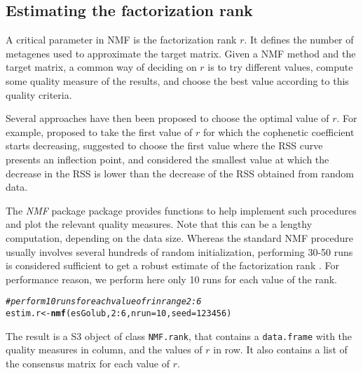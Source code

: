 \documentclass[a4paper]{article}\usepackage[]{graphicx}\usepackage[]{color}
\makeatletter
\newcommand{\hlnum}[1]{\textcolor[rgb]{0.686,0.059,0.569}{#1}}%
\newcommand{\hlcom}[1]{\textcolor[rgb]{0.678,0.584,0.686}{\textit{#1}}}%
\newcommand{\hlopt}[1]{\textcolor[rgb]{0,0,0}{#1}}%
\newcommand{\hlstd}[1]{\textcolor[rgb]{0.345,0.345,0.345}{#1}}%
\newcommand{\hlkwb}[1]{\textcolor[rgb]{0.69,0.353,0.396}{#1}}%
\newcommand{\hlkwc}[1]{\textcolor[rgb]{0.333,0.667,0.333}{#1}}%
\newcommand{\hlkwd}[1]{\textcolor[rgb]{0.737,0.353,0.396}{\textbf{#1}}}%
\newenvironment{kframe}{%
 \def\at@end@of@kframe{}%
 \ifinner\ifhmode%
  \def\at@end@of@kframe{\end{minipage}}%
  \begin{minipage}{\columnwidth}%
 \fi\fi%
 \def\FrameCommand##1{\hskip\@totalleftmargin \hskip-\fboxsep
 \colorbox{shadecolor}{##1}\hskip-\fboxsep
     \hskip-\linewidth \hskip-\@totalleftmargin \hskip\columnwidth}%
 \MakeFramed {\advance\hsize-\width
   \@totalleftmargin\z@ \linewidth\hsize
   \@setminipage}}%
 {\par\unskip\endMakeFramed%
 \at@end@of@kframe}
\newenvironment{knitrout}{}{} %
\let\code=\texttt
\newcommand{\pkgname}[1]{\textit{#1}\xspace}
\newcommand{\Rpkg}[1]{\pkgname{#1} package\xspace}
\newcommand{\nmfpack}{\Rpkg{NMF}}
\renewcommand{\cite}[1]{\parencite{#1}}
\makeatother
\begin{document}
\subsection{Estimating the factorization rank}
A critical parameter in NMF is the factorization rank $r$. 
It defines the number of metagenes used to approximate the target matrix.
Given a NMF method and the target matrix, a common way of deciding on $r$ is to try different values, compute some quality measure of the results, and choose the best value according to this quality criteria.

Several approaches have then been proposed to choose the optimal value of $r$.
For example, \cite{Brunet2004} proposed to take the first value of $r$ for which the cophenetic coefficient starts decreasing, \cite{Hutchins2008} suggested to choose the first value where the RSS curve presents an inflection point, and \cite{Frigyesi2008} considered the smallest value at which the decrease in the RSS is lower than the decrease of the RSS obtained from random data.

The \nmfpack package provides functions to help implement such procedures and plot the relevant quality measures.
Note that this can be a lengthy computation, depending on the data size.
Whereas the standard NMF procedure usually involves several hundreds of random initialization, performing 30-50 runs is considered sufficient to get a robust estimate of the factorization rank \cite{Brunet2004, Hutchins2008}.
For performance reason, we perform here only 10 runs for each value of the rank.

\begin{knitrout}
\color{fgcolor}\begin{kframe}
\begin{alltt}
\hlcom{# perform 10 runs for each value of r in range 2:6}
\hlstd{estim.r} \hlkwb{<-} \hlkwd{nmf}\hlstd{(esGolub,} \hlnum{2}\hlopt{:}\hlnum{6}\hlstd{,} \hlkwc{nrun} \hlstd{=} \hlnum{10}\hlstd{,} \hlkwc{seed} \hlstd{=} \hlnum{123456}\hlstd{)}
\end{alltt}
\end{kframe}
\end{knitrout}


The result is a S3 object of class \code{NMF.rank}, that contains a \code{data.frame} with the quality measures in column, and the values of $r$ in row.
It also contains a list of the consensus matrix for each value of $r$.
\end{document}
